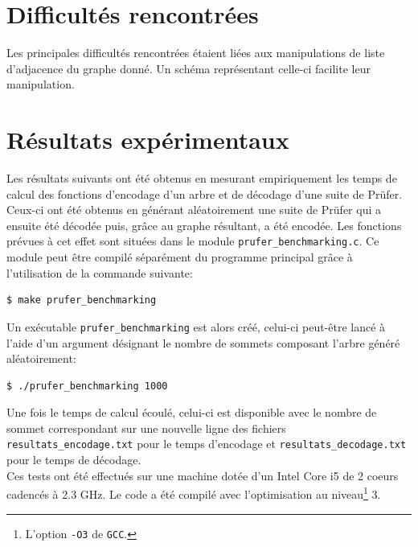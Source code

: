 \documentclass[a4paper, 11pt, oneside]{article}
\begin{document}
\section{Difficultés rencontrées}

Les principales difficultés rencontrées étaient liées aux manipulations de liste d'adjacence du graphe donné. Un schéma représentant celle-ci facilite leur manipulation.

\section{Résultats expérimentaux}

Les résultats suivants ont été obtenus en mesurant empiriquement les temps de calcul des fonctions d'encodage d'un arbre et de décodage d'une suite de Prüfer. Ceux-ci ont été obtenus en générant aléatoirement une suite de Prüfer qui a ensuite été décodée puis, grâce au graphe résultant, a été encodée. Les fonctions prévues à cet effet sont situées dans le module \texttt{prufer\_benchmarking.c}. Ce module peut être compilé séparément du programme principal grâce à l'utilisation de la commande suivante:

\begin{lstlisting}[language=bash]
$ make prufer_benchmarking 
\end{lstlisting}

Un exécutable \texttt{prufer\_benchmarking} est alors créé, celui-ci peut-être lancé à l'aide d'un argument désignant le nombre de sommets composant l'arbre généré aléatoirement:

\begin{lstlisting}[language=bash]
$ ./prufer_benchmarking 1000
\end{lstlisting}

Une fois le temps de calcul écoulé, celui-ci est disponible avec le nombre de sommet correspondant sur une nouvelle ligne des fichiers \texttt{resultats\_encodage.txt} pour le temps d'encodage et \texttt{resultats\_decodage.txt} pour le temps de décodage.\\

Ces tests ont été effectués sur une machine dotée d'un Intel Core i5 de 2 coeurs cadencés à 2.3 GHz. Le code a été compilé avec l'optimisation au niveau\footnote{L'option \texttt{-O3} de \texttt{GCC}.} 3.
\end{document}
